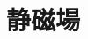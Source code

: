 \documentclass[../../../all/physics-standard_questions_all.tex]{subfiles}
\begin{document}
\section{静磁場}
\end{document}
